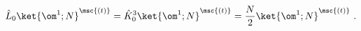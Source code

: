 \begin{equation}
\hat{L}_0\ket{\om^1;N}^{\msc{(t)}}=
\hat{K}^3_0\ket{\om^1;N}^{\msc{(t)}}
= \frac{N}{2}\ket{\om^1;N}^{\msc{(t)}}~.
\end{equation}

